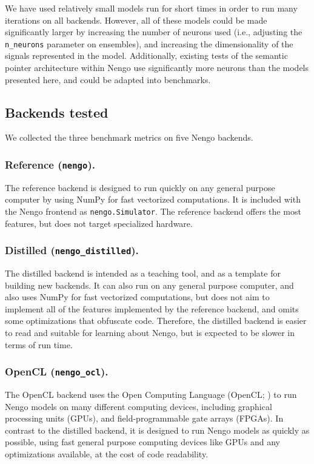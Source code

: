 \documentclass{frontiersSCNS}
\begin{document}
We have used relatively small
models run for short times in order
to run many iterations on all backends.
However, all of these models
could be made significantly larger
by increasing the number of neurons used
(i.e., adjusting the \texttt{n\_neurons}
parameter on ensembles),
and increasing the dimensionality
of the signals represented in the model.
Additionally, existing tests
of the semantic pointer architecture
within Nengo use significantly more neurons
than the models presented here,
and could be adapted into benchmarks.

\subsection{Backends tested}

We collected the three benchmark metrics
on five Nengo backends.

\subsubsection{Reference (\texttt{nengo}).}

The reference backend is designed to run quickly
on any general purpose computer
by using NumPy \citep{vanderwalt2011}
for fast vectorized computations.
It is included with the Nengo frontend
as \texttt{nengo.Simulator}.
The reference backend offers
the most features, but does not target
specialized hardware.

\subsubsection{Distilled (\texttt{nengo\_distilled}).}

The distilled backend is intended as a teaching tool,
and as a template for building new backends.
It can also run on any general purpose computer,
and also uses NumPy for fast vectorized computations,
but does not aim to implement all of the features
implemented by the reference backend,
and omits some optimizations that obfuscate code.
Therefore, the distilled backend is easier to read
and suitable for learning about Nengo,
but is expected to be slower in terms of run time.

\subsubsection{OpenCL (\texttt{nengo\_ocl}).}

The OpenCL backend uses the Open Computing Language
(OpenCL; \citealp{stone2010})
to run Nengo models on many different computing devices,
including graphical processing units (GPUs),
and field-programmable gate arrays (FPGAs).
In contrast to the distilled backend,
it is designed to run Nengo models
as quickly as possible,
using fast general purpose computing devices
like GPUs and any optimizations available,
at the cost of code readability.
\end{document}
